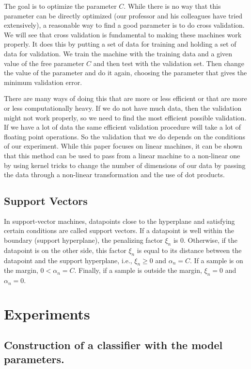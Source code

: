 \documentclass[journal]{IEEEtran}
\begin{document}
The goal is to optimize the parameter \( C \). While there is no way that this parameter can be directly optimized (our professor and his colleagues have tried extensively), a reasonable way to find a good parameter is to do cross validation. We will see that cross validation is fundamental to making these machines work properly. It does this by putting a set of data for training and holding a set of data for validation. We train the machine with the training data and a given value of the free parameter \( C \) and then test with the validation set. Then change the value of the parameter and do it again, choosing the parameter that gives the minimum validation error.

There are many ways of doing this that are more or less efficient or that are more or less computationally heavy. If we do not have much data, then the validation might not work properly, so we need to find the most efficient possible validation. If we have a lot of data the same efficient validation procedure will take a lot of floating point operations. So the validation that we do depends on the conditions of our experiment. While this paper focuses on linear machines, it can be shown that this method can be used to pass from a linear machine to a non-linear one by using kernel tricks to change the number of dimensions of our data by passing the data through a non-linear transformation and the use of dot products.

\subsection{Support Vectors}

In support-vector machines, datapoints close to the hyperplane and satisfying certain conditions are called support vectors. If a datapoint is well within the boundary (support hyperplane), the penalizing factor \( \xi_n \) is 0. Otherwise, if the datapoint is on the other side, this factor \( \xi_n \) is equal to its distance between the datapoint and the support hyperplane, i.e., \( \xi_n \geq 0\) and \( \alpha_n = C \). If a sample is on the margin, \( 0 < \alpha_n = C \). Finally, if a sample is outside the margin, \( \xi_n = 0 \) and \( \alpha_n = 0 \).

\section{Experiments}

\subsection{Construction of a classifier with the model parameters.}
\end{document}
